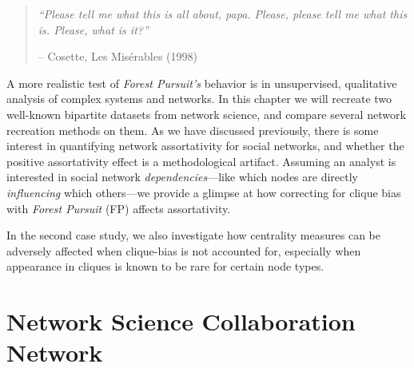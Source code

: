 \documentclass[%
	12pt,
		oneside,
		letterpaper
]{book}
\begin{document}
\begin{flushright}

\begin{minipage}{.7\linewidth}

\singlespacing

\begin{quote}
\emph{``Please tell me what this is all about, papa. Please, please tell
me what this is. Please, what is it?''}

\hfill -- Cosette, Les Misérables (1998)\\
\doublespacing
\end{quote}

\end{minipage}

\end{flushright}

A more realistic test of \emph{Forest Pursuit's} behavior is in
unsupervised, qualitative analysis of complex systems and networks. In
this chapter we will recreate two well-known bipartite datasets from
network science, and compare several network recreation methods on them.
As we have discussed
previously\autocite{PerceivedAssortativitySocial_Fisher2017}, there is
some interest in quantifying network assortativity for social networks,
and whether the positive assortativity effect is a methodological
artifact. Assuming an analyst is interested in social network
\emph{dependencies}---like which nodes are directly \emph{influencing}
which others---we provide a glimpse at how correcting for clique bias
with \emph{Forest Pursuit} (FP) affects assortativity.

In the second case study, we also investigate how centrality measures
can be adversely affected when clique-bias is not accounted for,
especially when appearance in cliques is known to be rare for certain
node types.

\section{Network Science Collaboration
Network}\label{network-science-collaboration-network}
\end{document}
